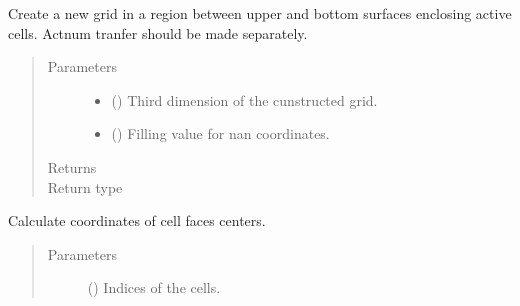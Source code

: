 \documentclass[letterpaper,10pt,english]{sphinxmanual}
\begin{document}
\begin{fulllineitems}
\begin{fulllineitems}
\label{\detokenize{api/grids:geology.src.CornerPointGrid.crop_minimal_grid}}
Create a new grid in a region between upper and bottom surfaces enclosing active cells.
Actnum tranfer should be made separately.
\begin{quote}\begin{description}
\item[{Parameters}] \leavevmode\begin{itemize}
\item {} 
 () \textendash{} Third dimension of the cunstructed grid.

\item {} 
 () \textendash{} Filling value for nan coordinates.

\end{itemize}

\item[{Returns}] \leavevmode
{}

\item[{Return type}] \leavevmode
{}

\end{description}\end{quote}

\end{fulllineitems}


\begin{fulllineitems}
\label{\detokenize{api/grids:geology.src.CornerPointGrid.faces_centers}}
Calculate coordinates of cell faces centers.
\begin{quote}\begin{description}
\item[{Parameters}] \leavevmode
{} (\sphinxstyleliteralemphasis{\sphinxupquote{{[}}}\sphinxstyleliteralemphasis{\sphinxupquote{{]}}}) \textendash{} Indices of the cells.


\end{description}
\end{quote}
\end{fulllineitems}
\end{fulllineitems}
\end{document}
